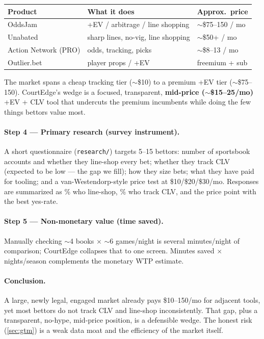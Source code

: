 \documentclass[12pt]{article}
\begin{document}
\begin{center}\small
\begin{tabular}{@{}lll@{}}
\toprule
\textbf{Product} & \textbf{What it does} & \textbf{Approx.\ price} \\
\midrule
OddsJam & +EV / arbitrage / line shopping & $\sim$\$75--150 / mo \\
Unabated & sharp lines, no-vig, line shopping & $\sim$\$50+ / mo \\
Action Network (PRO) & odds, tracking, picks & $\sim$\$8--13 / mo \\
Outlier.bet & player props / +EV & freemium + sub \\
\bottomrule
\end{tabular}
\end{center}

\noindent The market spans a cheap tracking tier ($\sim$\$10) to a premium +EV tier
($\sim$\$75--150). CourtEdge's wedge is a focused, transparent, \textbf{mid-price
($\sim$\$15--25/mo)} +EV + CLV tool that undercuts the premium incumbents while doing the few
things bettors value most.

\paragraph{Step 4 --- Primary research (survey instrument).} A short questionnaire
(\texttt{research/}) targets 5--15 bettors: number of sportsbook accounts and whether they
line-shop every bet; whether they track CLV (expected to be low --- the gap we fill); how they
size bets; what they have paid for tooling; and a van-Westendorp-style price test at
\$10/\$20/\$30/mo. Responses are summarized as \% who line-shop, \% who track CLV, and the
price point with the best yes-rate.

\paragraph{Step 5 --- Non-monetary value (time saved).} Manually checking $\sim$4 books $\times$
$\sim$6 games/night is several minutes/night of comparison; CourtEdge collapses that to one
screen. Minutes saved $\times$ nights/season complements the monetary WTP estimate.

\paragraph{Conclusion.} A large, newly legal, engaged market already pays \$10--150/mo for
adjacent tools, yet most bettors do not track CLV and line-shop inconsistently. That gap, plus
a transparent, no-hype, mid-price position, is a defensible wedge. The honest risk
(\cref{sec:gtm}) is a weak data moat and the efficiency of the market itself.
\end{document}
